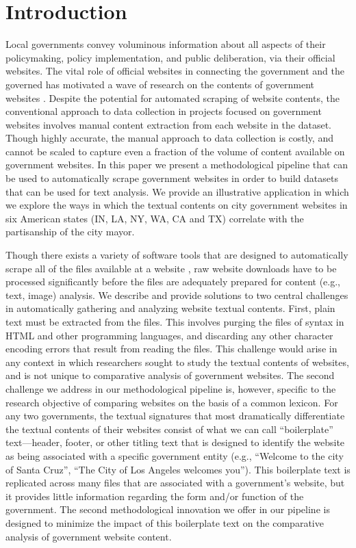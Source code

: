 \documentclass[11pt]{article}
\begin{document}
\thispagestyle{empty}
\doublespacing
\section{Introduction}


Local governments convey voluminous information about all aspects of their policymaking, policy implementation, and public deliberation, via their official websites. The vital role of official websites in connecting the government and the governed has motivated a wave of research on the contents of government websites \citep[e.g.,][]{grimmelikhuijsen2010transparency,wang2005evaluating,osman2014cobra}. Despite the potential for automated scraping of website contents, the conventional approach to data collection in projects focused on government websites involves manual content extraction from each website in the dataset. Though highly accurate, the manual approach to data collection is costly, and cannot be scaled to capture even a fraction of the volume of content available on government websites. In this paper we present a methodological pipeline that can be used to automatically scrape government websites in order to build datasets that can be used for text analysis. We provide an illustrative application in which we explore the ways in which the textual contents on city government websites in six American states (IN, LA, NY, WA, CA and TX) correlate with the partisanship of the city mayor.

Though there exists a variety of software tools that are designed to automatically scrape all of the files available at a website \citep{glez2013web}, raw website downloads have to be processed significantly before the files are adequately prepared for content (e.g., text, image) analysis. We describe and provide solutions to two central challenges in automatically gathering and analyzing website textual contents. First, plain text must be extracted from the files. This involves purging the files of syntax in HTML and other programming languages, and discarding any other character encoding errors that result from reading the files. This challenge would arise in any context in which researchers sought to study the textual contents of websites, and is not unique to comparative analysis of government websites. The second challenge we address in our methodological pipeline is, however, specific to the research objective of comparing websites on the basis of a common lexicon. For any two governments, the textual signatures that most dramatically differentiate the textual contents of their websites consist of what we can call ``boilerplate'' text---header, footer, or other titling text that is designed to identify the website as being associated with a specific government entity (e.g., ``Welcome to the city of Santa Cruz'', ``The City of Los Angeles welcomes you''). This boilerplate text is replicated across many files that are associated with a government's website, but it provides little information regarding the form and/or function of the government. The second methodological innovation we offer in our pipeline is designed to minimize the impact of this boilerplate text on the comparative analysis of government website content. 
\end{document}

